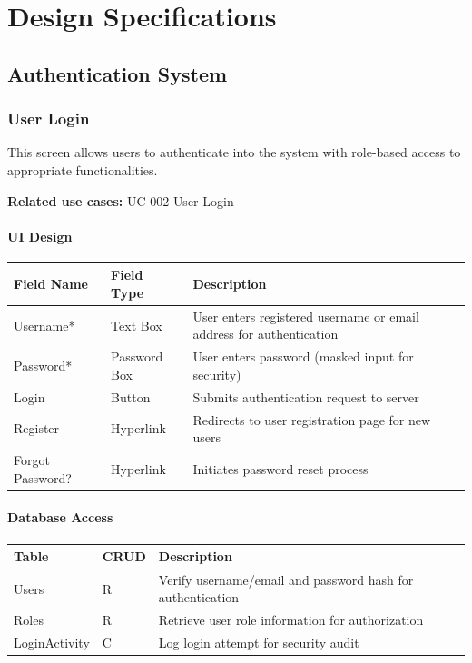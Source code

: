 \documentclass[12pt,a4paper]{article}
\begin{document}
\section{Design Specifications}

\subsection{Authentication System}

\subsubsection{User Login}

This screen allows users to authenticate into the system with role-based access to appropriate functionalities.

\textbf{Related use cases:} UC-002 User Login

\paragraph{UI Design}

\begin{longtable}{|p{3cm}|p{3cm}|p{8cm}|}
\hline
\textbf{Field Name} & \textbf{Field Type} & \textbf{Description} \\
\hline
Username* & Text Box & User enters registered username or email address for authentication \\
\hline
Password* & Password Box & User enters password (masked input for security) \\
\hline
Login & Button & Submits authentication request to server \\
\hline
Register & Hyperlink & Redirects to user registration page for new users \\
\hline
Forgot Password? & Hyperlink & Initiates password reset process \\
\hline
\end{longtable}

\paragraph{Database Access}

\begin{longtable}{|p{3cm}|p{2cm}|p{9cm}|}
\hline
\textbf{Table} & \textbf{CRUD} & \textbf{Description} \\
\hline
Users & R & Verify username/email and password hash for authentication \\
\hline
Roles & R & Retrieve user role information for authorization \\
\hline
LoginActivity & C & Log login attempt for security audit \\
\hline
\end{longtable}
\end{document}
